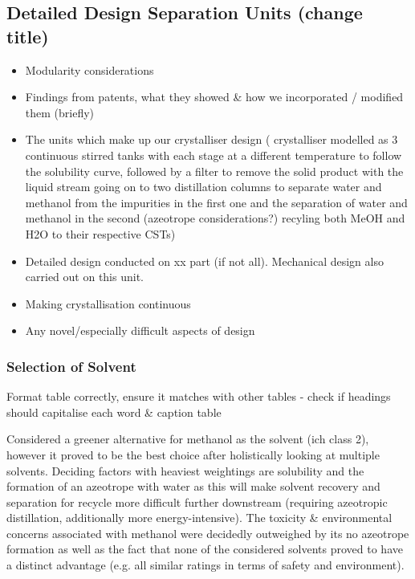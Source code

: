 \subsection{Detailed Design Separation Units (change title)}
\label{sec:detailed_sep_unit}
\begin{itemize}
    \item Modularity considerations 
    \item Findings from patents, what they showed & how we incorporated / modified them (briefly)
    \item The units which make up our crystalliser design ( crystalliser modelled as 3 continuous stirred tanks with each stage at a different temperature to follow the solubility curve, followed by a filter to remove the solid product with the liquid stream going on to two distillation columns to separate water and methanol from the impurities in the first one and the separation of water and methanol in the second (azeotrope considerations?) recyling both MeOH and H2O to their respective CSTs)
    \item  Detailed design conducted on xx part (if not all). Mechanical design also carried out on this unit.
    \item Making crystallisation continuous 
    \item Any novel/especially difficult aspects of design
    \end{itemize}
    
\subsubsection{Selection of Solvent}

Format table correctly, ensure it matches with other tables - check if headings should capitalise each word & caption table

Considered a greener alternative for methanol as the solvent (ich class 2), however it proved to be the best choice after holistically looking at multiple solvents. Deciding factors with heaviest weightings are solubility and the formation of an azeotrope with water as this will make solvent recovery and separation for recycle more difficult further downstream (requiring azeotropic distillation, additionally more energy-intensive). The toxicity \& environmental concerns associated with methanol were decidedly outweighed by its no azeotrope formation as well as the fact that none of the considered solvents proved to have a distinct advantage (e.g. all similar ratings in terms of safety and environment).  

